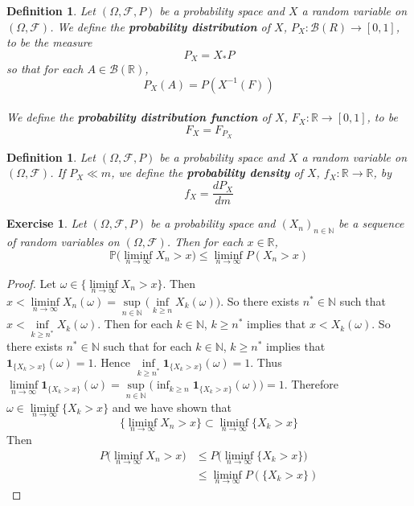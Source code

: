 \documentclass[12pt]{amsart}
\newtheorem{defn}[thm]{Definition}
\newtheorem{ex}[thm]{Exercise}
\newcommand{\om}{\omega}
\newcommand{\Om}{\Omega}
\newcommand{\N}{\mathbb{N}}
\newcommand{\R}{\mathbb{R}}
\renewcommand{\P}{\mathbb{P}}
\newcommand{\MB}{\mathcal{B}}
\newcommand{\MF}{\mathcal{F}}
\begin{document}
\begin{defn}
Let $(\Om, \MF, P)$ be a probability space and $X$ a random variable on $(\Om,\MF)$. We define the \textbf{probability distribution} of $X$, $P_X:\MB(R) \rightarrow [0,1]$, to be the measure $$P_X = X_*P$$ so that for each $A \in \MB(\R)$, $$P_X(A) = P(X^{-1}(F))$$ \\ We define the \textbf{probability distribution function} of $X$, $F_X:\R \rightarrow [0,1]$, to be $$F_X = F_{P_X}$$
\end{defn}

\begin{defn}
Let $(\Om, \MF, P)$ be a probability space and $X$ a random variable on $(\Om,\MF)$. If $P_X \ll m$, we define the \textbf{probability density} of $X$, $f_X: \R \rightarrow \R$, by $$f_X = \frac{dP_X}{dm}$$ 
\end{defn}

\begin{ex}
Let $(\Om, \MF, P)$ be a probability space and $(X_n)_{n \in \N}$ be a sequence of random variables on $(\Om, \MF)$. Then for each $x \in \R$, $$\P\bigg(\liminf_{n \rightarrow \infty}X_n > x\bigg) \leq \liminf_{n \rightarrow \infty} P(X_n > x)$$  
\end{ex}

\begin{proof}
Let $\om \in \bigg \{ \liminf\limits_{n \rightarrow \infty} X_n > x \bigg \}$. Then $x< \liminf\limits_{n \rightarrow \infty} X_n (\om) = \sup\limits_{n \in \N} \bigg( \inf\limits_{k \geq n} X_k(\om)\bigg)$. So there exists $n^* \in \N$ such that $x< \inf\limits_{k \geq n^*} X_k(\om)$. Then for each $k \in \N$, $k \geq n^*$ implies that $x < X_k(\om)$. So there exists $n^* \in \N$ such that for each $k \in \N$, $k \geq n^*$ implies that $\mathbf{1}_{\{X_k > x\}}(\om) =1$. Hence $\inf\limits_{k \geq n^*} \mathbf{1}_{\{X_k > x\}}(\om)  = 1$. Thus  $\liminf\limits_{n \rightarrow \infty} \mathbf{1}_{\{X_k > x\}}(\om) = \sup\limits_{n \in \N} \bigg( \inf_{k \geq n} \mathbf{1}_{\{X_k > x\}}(\om) \bigg) = 1$. Therefore $\om \in \liminf\limits_{n \rightarrow \infty} \{X_k > x\}$ and we have shown that $$\bigg \{ \liminf\limits_{n \rightarrow \infty} X_n > x \bigg \} \subset \liminf\limits_{n \rightarrow \infty} \{X_k > x\}$$ Then 
\begin{align*}
P \bigg( \liminf\limits_{n \rightarrow \infty} X_n > x \bigg)
& \leq P \bigg( \liminf\limits_{n \rightarrow \infty} \{X_k > x\} \bigg) \\
& \leq \liminf_{n \rightarrow \infty} P(\{X_k > x\})
\end{align*}
\end{proof}
\end{document}
